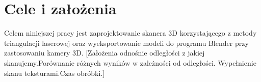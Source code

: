 \section{Cele i założenia}
Celem niniejszej pracy jest zaprojektowanie skanera 3D korzystającego z metody triangulacji laserowej  oraz wyeksportowanie modeli do programu Blender przy zastosowaniu kamery 3D.
[Założenia odnośnie odległości z jakiej skanujemy.Porównanie różnych wyników w zależności od odległości. Wypełnienie skanu teksturami.Czas obróbki.]